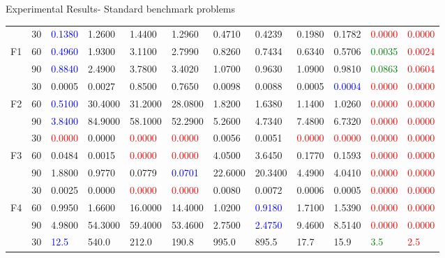 \documentclass [9pt,times] {beamer}
\begin{document}
\begin{frame}[plain]{Experimental Results- Standard benchmark problems}
\begin{center}
\begin{tabular}{p{0.08in} | p{0.09in} | p{0.25in} |  p{0.23in} |  p{0.25in}|  p{0.25in} |  p{0.25in} | p{0.25in} |  p{0.25in} | p{0.25in} |  p{0.25in} |  p{0.25in}}
	&	30	&\textcolor{blue}{	0.1380	}&	1.2600	&	1.4400	&	1.2960	&	0.4710	&	0.4239	&	0.1980	&	0.1782	&\textcolor{red}{	0.0000	}&\textcolor{red}{	0.0000	}\\
F1	&	60	&\textcolor{blue}{	0.4960	}&	1.9300	&	3.1100	&	2.7990	&	0.8260	&	0.7434	&	0.6340	&	0.5706	&\textcolor{green}{	0.0035	}&\textcolor{red}{	0.0024	}\\
	&	90	&\textcolor{blue}{	0.8840	}&	2.4900	&	3.7800	&	3.4020	&	1.0700	&	0.9630	&	1.0900	&	0.9810	&\textcolor{green}{	0.0863	}&\textcolor{red}{	0.0604	}\\
\hline																							
	&	30	&	0.0005	&	0.0027	&	0.8500	&	0.7650	&	0.0098	&	0.0088	&	0.0005	&\textcolor{blue}{	0.0004	}&\textcolor{red}{	0.0000	}&\textcolor{red}{	0.0000	}\\
F2	&	60	&\textcolor{blue}{	0.5100	}&	30.4000	&	31.2000	&	28.0800	&	1.8200	&	1.6380	&	1.1400	&	1.0260	&\textcolor{red}{	0.0000	}&\textcolor{red}{	0.0000	}\\
	&	90	&\textcolor{blue}{	3.8400	}&	84.9000	&	58.1000	&	52.2900	&	5.2600	&	4.7340	&	7.4800	&	6.7320	&\textcolor{red}{	0.0000	}&\textcolor{red}{	0.0000	}\\
\hline																							
	&	30	&\textcolor{red}{	0.0000	}&	0.0000	&\textcolor{red}{	0.0000	}&\textcolor{red}{	0.0000	}&	0.0056	&	0.0051	&\textcolor{red}{	0.0000	}&\textcolor{red}{	0.0000	}&\textcolor{red}{	0.0000	}&\textcolor{red}{	0.0000	}\\
F3	&	60	&	0.0484	&	0.0015	&\textcolor{red}{	0.0000	}&\textcolor{red}{	0.0000	}&	4.0500	&	3.6450	&	0.1770	&	0.1593	&\textcolor{red}{	0.0000	}&\textcolor{red}{	0.0000	}\\
	&	90	&	1.8800	&	0.9770	&	0.0779	&\textcolor{blue}{	0.0701	}&	22.6000	&	20.3400	&	4.4900	&	4.0410	&\textcolor{red}{	0.0000	}&\textcolor{red}{	0.0000	}\\
\hline																							
	&	30	&	0.0025	&	0.0000	&\textcolor{red}{	0.0000	}&\textcolor{red}{	0.0000	}&	0.0080	&	0.0072	&	0.0006	&	0.0005	&\textcolor{red}{	0.0000	}&\textcolor{red}{	0.0000	}\\
F4	&	60	&	0.9950	&	1.6600	&	16.0000	&	14.4000	&	1.0200	&\textcolor{blue}{	0.9180	}&	1.7100	&	1.5390	&\textcolor{red}{	0.0000	}&\textcolor{red}{	0.0000	}\\
	&	90	&	4.9800	&	54.3000	&	59.4000	&	53.4600	&	2.7500	&\textcolor{blue}{	2.4750	}&	9.4600	&	8.5140	&\textcolor{red}{	0.0000	}&\textcolor{red}{	0.0000	}\\
\hline																							
	&	30	&\textcolor{blue}{	12.5	}&	540.0	&	212.0	&	190.8	&	995.0	&	895.5	&	17.7	&	15.9	&\textcolor{green}{	3.5	}&\textcolor{red}{	2.5	}\\

\end{tabular}
\end{center}
\end{frame}
\end{document}
